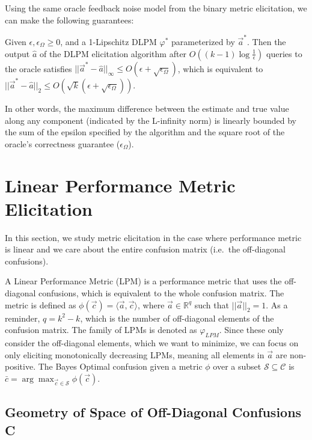\documentclass[
  letterpaper,
  numbers=noenddot,
  DIV=11,
  oneside]{scrreprt}
\theoremstyle{remark}
\begin{document}
Using the same oracle feedback noise model from the binary metric
elicitation, we can make the following guarantees:

Given \(\epsilon, \epsilon_\Omega \geq 0\), and a 1-Lipschitz DLPM
\(\varphi^*\) parameterized by \(\vec{a}^*\). Then the output
\(\hat{a}\) of the DLPM elicitation algorithm after
\(O((k-1)\log\frac{1}{\epsilon})\) queries to the oracle satisfies
\(||\vec{a}^* - \hat{a}||_\infty \leq O(\epsilon + \sqrt{\epsilon_\Omega})\),
which is equivalent to
\(||\vec{a}^* - \hat{a}||_2 \leq O(\sqrt{k}(\epsilon + \sqrt{\epsilon_\Omega}))\).

In other words, the maximum difference between the estimate and true
value along any component (indicated by the L-infinity norm) is linearly
bounded by the sum of the epsilon specified by the algorithm and the
square root of the oracle's correctness guarantee (\(\epsilon_\Omega\)).

\section{Linear Performance Metric
Elicitation}\label{linear-performance-metric-elicitation}

In this section, we study metric elicitation in the case where
performance metric is linear and we care about the entire confusion
matrix (i.e.~the off-diagonal confusions).

A Linear Performance Metric (LPM) is a performance metric that uses the
off-diagonal confusions, which is equivalent to the whole confusion
matrix. The metric is defined as
\(\phi(\vec{c}) = \langle \vec{a}, \vec{c} \rangle\), where
\(\vec{a} \in \mathbb{R}^q\) such that \(||\vec{a}||_2 = 1\). As a
reminder, \(q = k^2 - k\), which is the number of off-diagonal elements
of the confusion matrix. The family of LPMs is denoted as
\(\varphi_{LPM}\). Since these only consider the off-diagonal elements,
which we want to minimize, we can focus on only eliciting monotonically
decreasing LPMs, meaning all elements in \(\vec{a}\) are non-positive.
The Bayes Optimal confusion given a metric \(\phi\) over a subset
\(\mathcal{S} \subseteq \mathcal{C}\) is
\(\bar{c} = \arg\max_{\vec{c} \in \mathcal{S}} \phi(\vec{c})\).

\subsection{Geometry of Space of Off-Diagonal Confusions
C}\label{geometry-of-space-of-off-diagonal-confusions-c}
\end{document}
